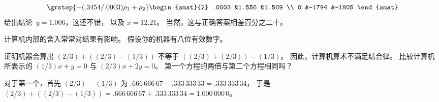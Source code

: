 \begin{exercises}
\begin{answer}
\begin{exparts}
\begin{equation*}
            \grstep{-(.3454/.0003)\rho_1+\rho_2}
            \begin{amat}{2}
              .0003  &1.556  &1.569  \\
              0      &-1794   &-1805
            \end{amat}
          \end{equation*}
          给出结论~$y=1.006$，这还不错，
          以及 $x=12.21$。
          当然，这与正确答案相差百分之二十。
      \end{exparts}
    \end{answer}
  \item 
    计算机内部的舍入常常对结果有影响。
    假设你的机器有八位有效数字。
    \begin{exparts}
      \partsitem 证明机器会算出
         $(2/3)+((2/3)-(1/3))$ 不等于 $((2/3)+(2/3))-(1/3)$。
         因此，计算机算术不满足结合律。
      \partsitem 比较计算机所表示的 $(1/3)x+y=0$
         与 $(2/3)x+2y=0$。
         第一个方程的两倍与第二个方程相同吗？
    \end{exparts}
    \begin{answer}
      \begin{exparts}
        \partsitem 对于第一个，首先 $(2/3)-(1/3)$ 为
          $.666\,666\,67-.333\,333\,33=.333\,333\,34$，
          于是
          $(2/3)+((2/3)-(1/3))=.666\,666\,67+.333\,333\,34=1.000\,000\,0$。


\end{exparts}
\end{answer}
\end{exercises}
